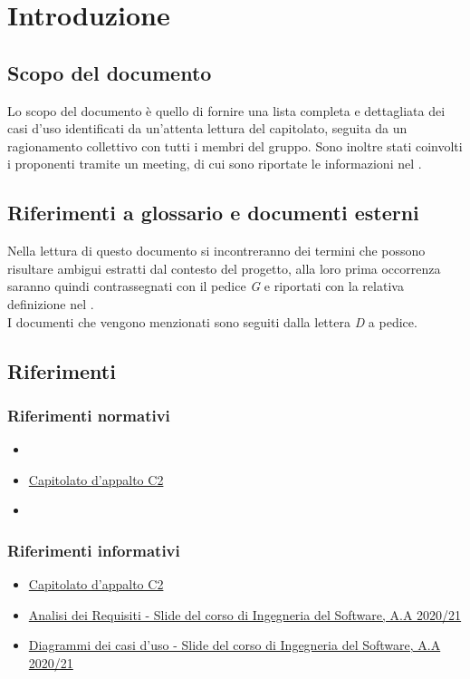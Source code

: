 \section{Introduzione} \label{_introduzione}
\subsection{Scopo del documento}
Lo scopo del documento è quello di fornire una lista completa e dettagliata dei casi d'uso identificati
da un'attenta lettura del capitolato, seguita da un ragionamento collettivo con tutti i membri del gruppo.
Sono inoltre stati coinvolti i proponenti tramite un meeting, di cui sono riportate le informazioni nel .

\subsection{Riferimenti a glossario e documenti esterni}
Nella lettura di questo documento si incontreranno dei termini che possono risultare ambigui estratti dal contesto
del progetto, alla loro prima occorrenza saranno quindi contrassegnati con il pedice \textit{G} e riportati con la relativa definizione nel . \\
I documenti che vengono menzionati sono seguiti dalla lettera \textit{D} a pedice.

\subsection{Riferimenti}
\subsubsection{Riferimenti normativi}
\begin{itemize}
    \item {}
    \item \href{https://www.math.unipd.it/~tullio/IS-1/2020/Progetto/C2.pdf}{Capitolato d'appalto C2}
    \item {}
\end{itemize}

\subsubsection{Riferimenti informativi}
\begin{itemize}
    \item \href{https://www.math.unipd.it/~tullio/IS-1/2020/Progetto/C2.pdf}{Capitolato d'appalto C2}
    \item \href{https://www.math.unipd.it/~tullio/IS-1/2020/Dispense/L07.pdf}{Analisi dei Requisiti - Slide del corso di Ingegneria del Software, A.A 2020/21}
    \item \href{https://www.math.unipd.it/~rcardin/swea/2021/Diagrammi%20Use%20Case_4x4.pdf}{Diagrammi dei casi d'uso - Slide del corso di Ingegneria del Software, A.A 2020/21}
    
\end{itemize}
